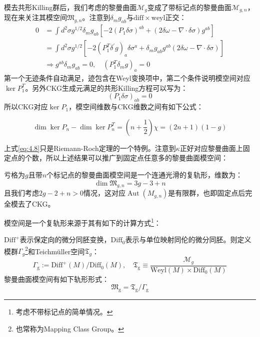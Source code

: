 模去共形Killing群后，我们考虑的黎曼曲面$\mathcal{M}_g$变成了带标记点的黎曼曲面$\mathcal{M}_{g,n}$，现在来关注其模空间$\mathfrak{M}_{g,n}$。注意到$\delta_m g_{ab}$与$\mathrm{diff\times weyl}$正交：
\begin{equation}
	\begin{aligned}
		0&=\int d^2\sigma g^{1/2}\delta_mg_{ab}\left[-2(P_1\delta\sigma)^{ab}+(2\delta\omega-\nabla\cdot\delta\sigma)g^{ab}\right]\\
		&=\int d^2\sigma g^{1/2}\left[-2(P_1^T\delta^{\prime}g)_a\delta\sigma^a+\delta_mg_{ab}g^{ab}(2\delta\omega-\nabla\cdot\delta\sigma)\right]\\
		&\Rightarrow  g^{ab}\delta_m g_{ab} =0,\quad (P^T_1\delta_m g)_a=0
	\end{aligned}
\end{equation}
第一个无迹条件自动满足，迹包含在Weyl变换项中，第二个条件说明模空间对应$\ker P^T_1$。另外CKG生成元满足的共形Killing方程可以写为：
\begin{equation}
	(P_1\delta\sigma)_{ab}=0
\end{equation}
所以CKG对应$\ker P_1$，模空间维数与CKG维数之间有如下公式：
\begin{boxedtext}
	\begin{equation}
		\label{eq:4.8}
		\dim\ker P_n-\dim\ker P_n^T=(n+\frac12)\chi=(2n+1)(1-g)
	\end{equation}
\end{boxedtext}
上式\ref{eq:4.8}只是Riemann-Roch定理的一个特例。注意到$\kappa$正好对应黎曼曲面上固定点的个数，所以上述结果可以推广到固定点任意多的黎曼曲面模空间：
\begin{boxedtext}[模空间维数]
	亏格为$g$且带$n$个标记点的黎曼曲面模空间是一个连通光滑的复轨形，维数为：
	\begin{equation}
		\label{eq:4.9}
		\dim\mathfrak{M}_{g,n} = 3 g - 3 + n
	\end{equation}
	且我们考虑$2g-2+n>0$情况，这对应$\operatorname{Aut}(M_{g,n})$是有限群，也即固定点后完全模去了CKG。
\end{boxedtext}
模空间是一个复轨形来源于其有如下的计算方式\footnote{考虑不带标记点的简单情况。}：
\begin{boxedtext}
	$\mathrm{Diff}^+$表示保定向的微分同胚变换，$\mathrm{Diff}_0$表示与单位映射同伦的微分同胚。则定义模群$\Gamma_g$\footnote{也常称为Mapping Class Group。}和Teichm\"uller空间$\mathfrak{T}_g$：
	\begin{equation*}
		\Gamma_\mathrm{g}:=\mathrm{Diff}^+(M)/\mathrm{Diff}_0(M),\quad \mathfrak{T}_\mathrm{g}\equiv\frac{\mathcal{M}_g}{\mathrm{Weyl}(M)\times\mathrm{Diff}_0(M)}
	\end{equation*}
	黎曼曲面模空间有如下轨形形式：
	\begin{equation}
		\label{eq:4.10}
		\mathfrak{M}_\mathrm{g}=\mathfrak{T}_\mathrm{g}/\Gamma_\mathrm{g}
	\end{equation}
\end{boxedtext}
